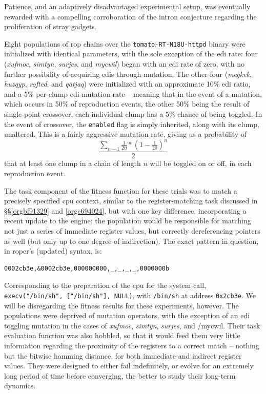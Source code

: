 \documentclass[12pt,glossary]{dalthesis}
\begin{document}
Patience, and an adaptively disadvantaged experimental setup, was eventually
rewarded with a compelling corroboration of the intron conjecture regarding
the proliferation of stray gadgets. 

Eight populations of \gls{rop} chains over the \texttt{tomato-RT-N18U-httpd} binary were
initialized with identical parameters, with the sole exception of the \gls{edi}
rate: four (\emph{xufmoc}, \emph{simtyn}, \emph{surjes}, and \emph{mycwil}) began with an \gls{edi}
rate of zero, with no further possibility of acquiring \glspl{edi} through
mutation. The other four (\emph{megkek}, \emph{huzqyp}, \emph{rofted}, and \emph{qatjaq}) were
initialized with an approximate 10\% \gls{edi} ratio, and a 5\% per-clump \gls{edi}
mutation rate -- meaning that in the event of a mutation, which occurs in 50\% of
reproduction events, the other 50\% being the result of single-point crossover,
each individual clump has a 5\% chance of being toggled. In the event of
crossover, the \texttt{enabled} flag is simply inherited, along with its clump,
unaltered. This is a fairly aggressive mutation rate, giving us a probability of
$$ \frac{\sum_{n-1} \frac{1}{20} * (1 - \frac{1}{20})^n}{2} $$ that at least one
clump in a chain of length \(n\) will be toggled on or off, in each reproduction
event.

The task component of the fitness function for these trials was to match a
precisely specified \gls{cpu} context, similar to the register-matching task
discussed in \S\S \ref{orgbf91329} and \ref{orgc694024}, but
with one key difference, incorporating a recent update to the engine: the
population would be responsible for matching not just a series of immediate
register values, but correctly dereferencing pointers as well (but only up to
one degree of indirection). The exact
pattern in question, in \gls{roper}'s (updated) syntax, is:
\begin{verbatim}
0002cb3e,&0002cb3e,000000000,_,_,_,_,0000000b
\end{verbatim}
Corresponding to the preparation of the \gls{cpu} for the system call,
\texttt{execv("/bin/sh", ["/bin/sh"], NULL)}, with \texttt{/bin/sh} at address
\texttt{0x2cb3e}. We will be disregarding the fitness results for these experiments,
however. The populations were deprived of mutation operators, with the exception
of an \gls{edi} toggling mutation in the cases of \emph{xufmoc}, \emph{simtyn}, \emph{surjes}, and
/mycwil. Their task evaluation function was also hobbled, so that it would feed
them very little information regarding the proximity of the registers to a correct match -- nothing but the bitwise hamming distance, for both immediate and indirect register
values. They were designed to either fail indefinitely, or evolve for an extremely
long period of time before converging, the better to study their long-term
dynamics. 
\end{document}
